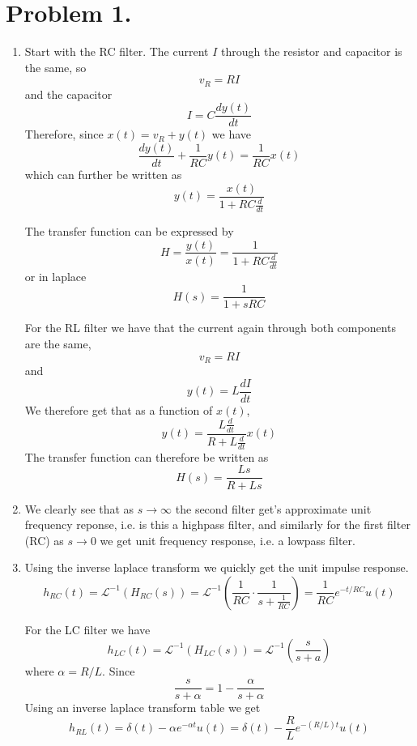 \documentclass[a4paper,11pt,norsk]{article}
\begin{document}


\section*{Problem 1.}
\begin{enumerate}
    \item 
        Start with the RC filter.
        The current $I$ through the resistor and capacitor is the same, so
        \[
            v_R = RI
        \]
        and the capacitor
        \[
            I = C \frac{d y(t)}{dt}
        \]
        Therefore, since $x(t) = v_R + y(t)$ we have
        \[
            \frac{d y(t)}{dt} + \frac{1}{RC}y(t) = \frac{1}{RC}x(t)
        \]
        which can further be written as 
        \[
            y(t) = \frac{x(t)}{1 + RC \frac{d}{dt}}
        \]
        
        The transfer function can be expressed by 
        \[
            H = \frac{y(t)}{x(t)} = \frac{1}{1 + RC \frac{d}{dt}}
        \]
        or in laplace
        \[
            H(s) = \frac{1}{1 + sRC}
        \]

        For the RL filter we have that the current again through both components are the same,
        \[
            v_R = RI
        \]
        and
        \[
            y(t) = L \frac{dI}{dt}
        \]
        We therefore get that as a function of $x(t)$, 
        \[
            y(t) = \frac{L \frac{d}{dt}}{R + L \frac{d}{dt}} x(t)
        \]
        The transfer function can therefore be written as 
        \[
            H(s) = \frac{Ls}{R + Ls}
        \]
        
    \item We clearly see that as $s \to \infty$ the second filter get's approximate unit frequency reponse, i.e. is this a highpass filter, and 
        similarly for the first filter (RC) as $s \to 0$ we get unit frequency response, i.e. a lowpass filter.
                
    \item Using the inverse laplace transform we quickly get the unit impulse response.
        \[
            h_{RC}(t) = \mathcal{L}^{-1}(H_{RC}(s)) = \mathcal{L}^{-1}\left(\frac{1}{RC} \cdot \frac{1}{s + \frac{1}{RC}}\right) = \frac{1}{RC}e^{-t/RC}u(t)
        \]

        For the LC filter we have 
        \[
            h_{LC}(t) = \mathcal{L}^{-1}(H_{LC}(s)) = \mathcal{L}^{-1}\left(\frac{s}{s + a}\right)
        \]
        where $\alpha = R/L$. Since
        \[
            \frac{s}{s + \alpha} = 1 - \frac{\alpha}{s + \alpha}
        \]
        Using an inverse laplace transform table we get
        \[
            h_{RL}(t) = \delta(t) - \alpha e^{-\alpha t}u(t) = \delta(t) - \frac{R}{L}e^{-(R/L)t}u(t)
        \]
\end{enumerate}
\end{document}
